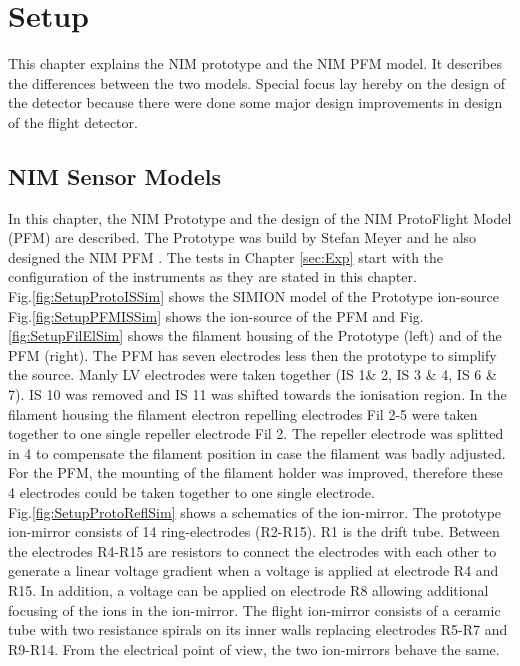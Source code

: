 \section{Setup}\label{sec:setup}
	

	This chapter explains the NIM prototype and the NIM PFM model. It describes the differences between the two models. Special focus lay hereby on the design of the detector because there were done some major design improvements in design of the flight detector.
	
	
	\subsection{NIM Sensor Models }\label{subsec:setupInst}
	In this chapter, the NIM Prototype and the design of the NIM ProtoFlight Model (PFM) are described. The Prototype was build by Stefan Meyer and he also designed the NIM PFM \cite{Diss_Meyer}. The tests in Chapter \ref{sec:Exp} start with the configuration of the instruments as they are stated in this chapter.\\
	Fig.\ref{fig:SetupProtoISSim} shows the SIMION model of the Prototype ion-source Fig.\ref{fig:SetupPFMISSim} shows the ion-source of the PFM and Fig.\ref{fig:SetupFilElSim} shows the filament housing of the Prototype (left) and of the PFM (right). The PFM has seven electrodes less then the prototype to simplify the source. Manly LV electrodes were taken together (IS 1\& 2, IS 3 \& 4, IS 6 \& 7). IS 10 was removed and IS 11 was shifted towards the ionisation region. In the filament housing the filament electron repelling electrodes Fil 2-5 were taken together to one single repeller electrode Fil 2. The repeller electrode was splitted in 4 to compensate the filament position in case the filament was badly adjusted. For the PFM, the mounting of the filament holder was improved, therefore these 4 electrodes could be taken together to one single electrode.\\
	Fig.\ref{fig:SetupProtoReflSim} shows a schematics of the ion-mirror. The prototype ion-mirror consists of 14 ring-electrodes (R2-R15). R1 is the drift tube. Between the electrodes R4-R15 are resistors to connect the electrodes with each other to generate a linear voltage gradient when a voltage is applied at electrode R4 and R15. In addition, a voltage can be applied on electrode R8 allowing additional focusing of the ions in the ion-mirror.	The flight ion-mirror consists of a ceramic tube with two resistance spirals on its inner walls replacing electrodes R5-R7 and R9-R14. From the electrical point of view, the two ion-mirrors behave the same.\\
		
